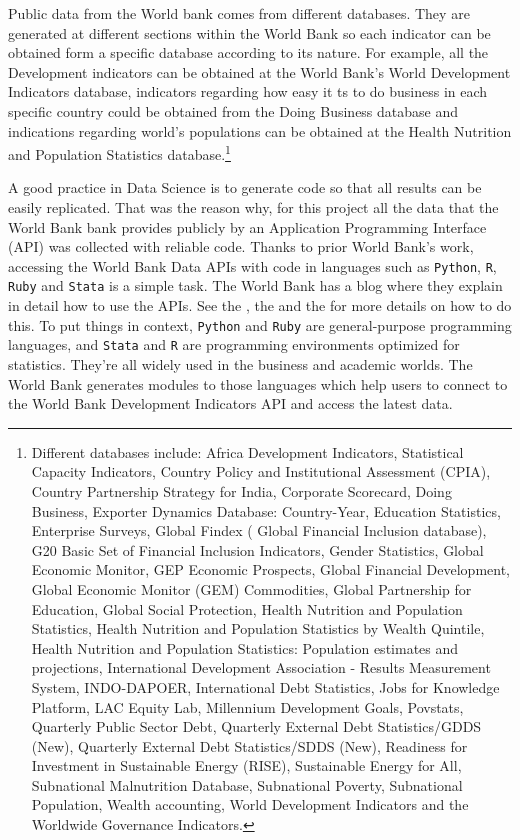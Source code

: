 Public data from the World bank comes from different databases. They are generated at different sections within the World Bank so each indicator can be obtained form a specific database according to its nature. For example, all the Development indicators can be obtained at the World Bank's World Development Indicators database, indicators regarding how easy it ts to do business in each specific country could be obtained from the Doing Business database and indications regarding world's populations can be obtained at the Health Nutrition and Population Statistics database.\footnote{Different databases include:
Africa Development Indicators, Statistical Capacity Indicators, Country Policy and Institutional Assessment (CPIA), Country Partnership Strategy for India, Corporate Scorecard, Doing Business, Exporter Dynamics Database: Country-Year, Education Statistics, Enterprise Surveys, Global Findex ( Global Financial Inclusion database), G20 Basic Set of Financial Inclusion Indicators, Gender Statistics, Global Economic Monitor, GEP Economic Prospects, Global Financial Development, Global Economic Monitor (GEM) Commodities, Global Partnership for Education, Global Social Protection, Health Nutrition and Population Statistics, Health Nutrition and Population Statistics by Wealth Quintile, Health Nutrition and Population Statistics: Population estimates and projections, International Development Association - Results Measurement System, INDO-DAPOER, International Debt Statistics, Jobs for Knowledge Platform, LAC Equity Lab, Millennium Development Goals, Povstats, Quarterly Public Sector Debt, Quarterly External Debt Statistics/GDDS (New), Quarterly External Debt Statistics/SDDS (New), Readiness for Investment in Sustainable Energy (RISE), Sustainable Energy for All, Subnational Malnutrition Database, Subnational Poverty, Subnational Population, Wealth accounting, World Development Indicators and the  Worldwide Governance Indicators.}

A good practice in Data Science is to generate code so that all results can be easily replicated. That was the reason why, for this project all the data that the World Bank bank provides publicly by an Application Programming Interface (API) was collected with reliable code. Thanks to prior World Bank's work, accessing the World Bank Data APIs with code in languages such as \texttt{Python}, \texttt{R}, \texttt{Ruby} and \texttt{Stata} is a simple task. The World Bank has a blog where they explain in detail how to use the APIs. See the \cite{wb_api}, the \cite{wb_python} and the \cite{wb_r} for more details on how to do this. To put things in context, \texttt{Python} and \texttt{Ruby} are general-purpose programming languages, and \texttt{Stata} and \texttt{R} are programming environments optimized for statistics. They're all widely used in the business and academic worlds. The World Bank generates modules to those languages which help users to connect to the World Bank Development Indicators API and access the latest data.

